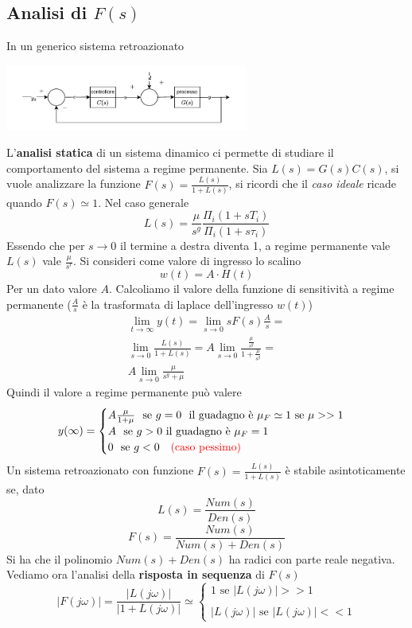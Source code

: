 \documentclass[10pt, letterpaper]{report}
\begin{document}
\subsection{Analisi di $F(s)$}
In un generico sistema retroazionato 
\begin{center}
    \includegraphics[width=0.6\textwidth ]{images/classicoControllo3.pdf}
 \end{center}
 L'\textbf{analisi statica} di un sistema dinamico ci permette di studiare il comportamento del sistema a regime permanente.
Sia $L(s)=G(s)C(s)$, si vuole analizzare la funzione $F(s)=\frac{L(s)}{1+L(s)}$, si ricordi che il \textit{caso ideale} ricade quando $F(s)\simeq 1$. Nel caso generale 
$$ L(s)=\frac{\mu}{s^g}\frac{\Pi_i(1+sT_i)}{\Pi_i(1+s\tau_i)}$$
Essendo che per $s\rightarrow 0$ il termine a destra diventa 1, a regime permanente 
vale $L(s)$ vale $\frac{\mu}{s^r}$. Si consideri come valore di ingresso lo scalino $$ w(t)=A\cdot H(t)$$
Per un dato valore $A$. Calcoliamo il valore della funzione di sensitività a regime permanente ($\frac{A}{s}$ è la trasformata di laplace dell'ingresso $w(t)$)
\begin{eqnarray}
    \lim_{t\rightarrow\infty}y(t)=\lim_{s\rightarrow0}sF(s)\frac{A}{s}= \\ 
    \lim_{s\rightarrow0} \frac{L(s)}{1+L(s)}=A\lim_{s\rightarrow0}\frac{\frac{\mu}{s^g}}{1+\frac{\mu}{s^g}} = \\ 
    A\lim_{s\rightarrow0}\frac{\mu}{s^g+\mu}
\end{eqnarray}
Quindi il valore a regime permanente può valere 
$$ y(\infty)=\begin{cases}
    A\frac{\mu}{1+\mu}\  \text{ se }g=0 \ \ \text{il guadagno è }\mu_F\simeq 1 \text{ se }\mu>>1\\ 
    A \ \text{ se }g>0 \text{ il guadagno è }\mu_F=1\\ 
    0 \ \text{ se }g<0 \ \ \ \text{\color{red}(caso pessimo)\color{black}}
\end{cases}$$
Un sistema retroazionato con funzione $F(s)=\frac{L(s)}{1+L(s)}$ è stabile asintoticamente se, dato $$ L(s)=\frac{Num(s)}{Den(s)}$$
$$ F(s)=\frac{Num(s)}{Num(s)+Den(s)}$$ 
Si ha che il polinomio $Num(s)+Den(s)$ ha radici con parte reale negativa.
Vediamo ora l'analisi della \textbf{risposta in sequenza} di $F(s)$ 
$$ |F(j\omega)|=\frac{|L(j\omega)|}{|1+L(j\omega)|}\simeq \begin{cases}
    1 \text{ se }|L(j\omega)|>>1\\ \\
    |L(j\omega)|\text{ se }|L(j\omega)|<<1
\end{cases}$$
\end{document}
